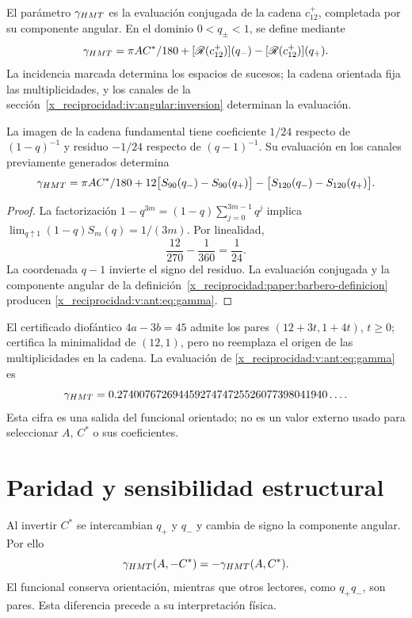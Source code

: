 \begin{definition}
\label{x_reciprocidad:paper:barbero-definicion}
El parámetro \(\gamma_{HMT}\) es la evaluación conjugada de la cadena
\(c_{12}^{+}\), completada por su componente angular. En el dominio
\(0<q_\pm<1\), se define mediante
\[
\gamma_{HMT}=\pi AC^*/180
+[\mathscr R(c_{12}^{+})](q_-)-[\mathscr R(c_{12}^{+})](q_+).
\]
La incidencia marcada determina los espacios de sucesos; la cadena
orientada fija las multiplicidades, y los canales de la
sección~\ref{x_reciprocidad:iv:angular:inversion} determinan la evaluación.
\end{definition}

\begin{theorem}
La imagen de la cadena fundamental tiene coeficiente $1/24$
respecto de $(1-q)^{-1}$ y residuo $-1/24$ respecto de $(q-1)^{-1}$.
Su evaluación en los canales previamente generados determina
\begin{equation}
\gamma_{HMT}=
\pi AC^*/180
+12\bigl[S_{90}(q_-)-S_{90}(q_+)\bigr]
-\bigl[S_{120}(q_-)-S_{120}(q_+)\bigr].
\label{x_reciprocidad:v:ant:eq:gamma}
\end{equation}
\end{theorem}
\begin{proof}
La factorización $1-q^{3m}=(1-q)\sum_{j=0}^{3m-1}q^j$ implica
$\lim_{q\uparrow1}(1-q)S_m(q)=1/(3m)$. Por linealidad,
\[
\frac{12}{270}-\frac1{360}=\frac1{24}.
\]
La coordenada $q-1$ invierte el signo del residuo.
La evaluación conjugada y la componente angular de la definición~\ref{x_reciprocidad:paper:barbero-definicion}
producen \eqref{x_reciprocidad:v:ant:eq:gamma}.
\end{proof}

El certificado diofántico $4a-3b=45$ admite los pares
$(12+3t,1+4t)$, $t\ge0$; certifica la minimalidad de $(12,1)$,
pero no reemplaza el origen de las multiplicidades en la cadena.
La evaluación de \eqref{x_reciprocidad:v:ant:eq:gamma} es
\[
\gamma_{HMT}
=0.27400767269445927474725526077398041940\ldots.
\]
Esta cifra es una salida del funcional orientado; no es un valor externo
usado para seleccionar $A$, $C^*$ o sus coeficientes.

\section{Paridad y sensibilidad estructural}
Al invertir $C^*$ se intercambian $q_+$ y $q_-$ y cambia de signo
la componente angular. Por ello
\[
\gamma_{HMT}(A,-C^*)=-\gamma_{HMT}(A,C^*).
\]
El funcional conserva orientación, mientras que otros lectores,
como $q_+q_-$, son pares. Esta diferencia precede a su interpretación física.

